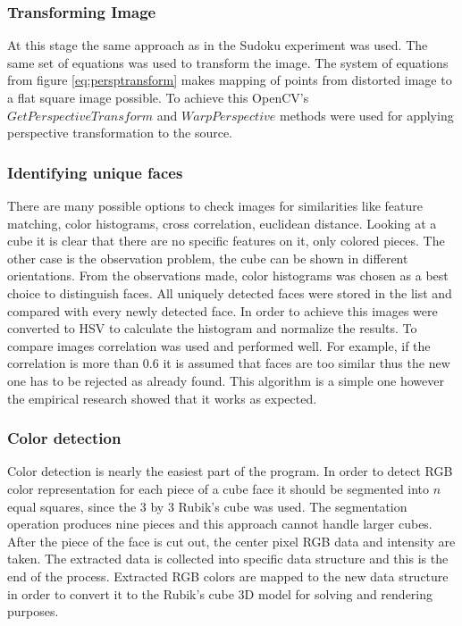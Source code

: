 \documentclass[../../main]{subfiles}
\begin{document}
\subsubsection{Transforming Image}

At this stage the same approach as in the Sudoku experiment was used. The same set of equations was used to transform the image. The system of equations from figure \ref{eq:persptransform} makes mapping of points from distorted image to a flat square image possible. To achieve this \ac{OpenCV}'s $GetPerspectiveTransform$ and $WarpPerspective$ methods were used for applying perspective transformation to the source.

\subsubsection{Identifying unique faces}

There are many possible options to check images for similarities like feature matching, color histograms, cross correlation, euclidean distance. Looking at a cube it is clear that there are no specific features on it, only colored pieces. The other case is the observation problem, the cube can be shown in different orientations. From the observations made, color histograms was chosen as a best choice to distinguish faces.
All uniquely detected faces were stored in the list and compared with every newly detected face. In order to achieve this images were converted to \ac{HSV} to calculate the histogram and normalize the results. To compare images correlation was used and performed well. For example, if the correlation is more than 0.6 it is assumed that faces are too similar thus the new one has to be rejected as already found.
This algorithm is a simple one however the empirical research showed that it works as expected.

\subsubsection{Color detection}

Color detection is nearly the easiest part of the program. In order to detect \ac{RGB} color representation for each piece of a cube face it should be segmented into $n$ equal squares, since the 3 by 3 Rubik's cube was used. The segmentation operation produces nine pieces and this approach cannot handle larger cubes.
After the piece of the face is cut out, the center pixel \ac{RGB} data and intensity are taken. The extracted data is collected into specific data structure and this is the end of the process. Extracted \ac{RGB} colors are mapped to the new data structure in order to convert it to the Rubik's cube 3D model for solving and rendering purposes. 
\end{document}
